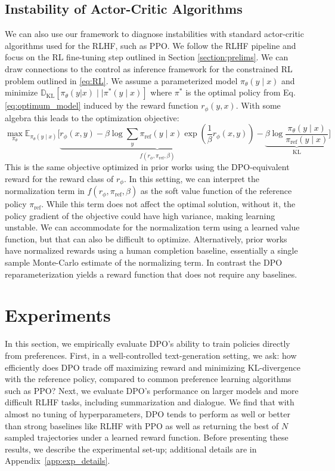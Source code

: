 \documentclass{article}
\begin{document}
\subsection{Instability of Actor-Critic Algorithms}
We can also use our framework to diagnose instabilities with standard actor-critic algorithms used for the RLHF, such as PPO. We follow the RLHF pipeline and focus on the RL fine-tuning step outlined in Section \ref{section:prelims}. We can draw connections to the control as inference framework \cite{levine2018reinforcement} for the constrained RL problem outlined in \ref{eq:RL}. We assume a parameterized model $\pi_{\theta}(y\mid x)$ and minimize $\mathbb{D}_{\text{KL}}[\pi_{\theta}(y|x) \mid \mid \pi^*(y\mid x)]$ where $\pi^*$ is the optimal policy from Eq. \ref{eq:optimum_model} induced by the reward function $r_{\phi}(y, x)$. With some algebra this leads to the optimization objective:
\begin{equation}\label{eq:AC}
    \max_{\pi_{\theta}}\mathbb{E}_{\pi_{\theta}(y\mid x)}\bigg[\underbrace{r_{\phi}(x, y) -\beta\log\sum_{y}\pi_\text{ref}(y\mid x)\exp\left(\frac{1}{\beta}r_{\phi}(x, y)\right)}_{f(r_{\phi}, \pi_\text{ref}, \beta)} - \underbrace{\beta\log\frac{\pi_{\theta}(y\mid x)}{\pi_\text{ref}(y\mid x)}}_{\text{KL}}\bigg]
\end{equation}
This is the same objective optimized in prior works
\citep{ziegler2020finetuning, stiennon2022learning, bai2022training, ouyang2022training} using the DPO-equivalent reward for the reward class of $r_{\phi}$. In this setting, we can interpret the normalization term in $f(r_{\phi}, \pi_\text{ref}, \beta)$ as the soft value function of the reference policy $\pi_\text{ref}$. While this term does not affect the optimal solution, without it, the policy gradient of the objective could have high variance, making learning unstable. We can accommodate for the normalization term using a learned value function, but that can also be difficult to optimize. Alternatively, prior works have normalized rewards using a human completion baseline, essentially a single sample Monte-Carlo estimate of the normalizing term. In contrast the DPO reparameterization yields a reward function that does not require any baselines.

\section{Experiments}
In this section, we empirically evaluate DPO's ability to train policies directly from preferences. First, in a well-controlled text-generation setting, we ask: how efficiently does DPO trade off maximizing reward and minimizing KL-divergence with the reference policy, compared to common preference learning algorithms such as PPO? Next, we evaluate DPO's performance on larger models and more difficult RLHF tasks, including summarization and dialogue. We find that with almost no tuning of hyperparameters, DPO tends to perform as well or better than strong baselines like RLHF with PPO as well as returning the best of $N$ sampled trajectories under a learned reward function. Before presenting these results, we describe the experimental set-up; additional details are in Appendix~\ref{app:exp_details}.
\end{document}
